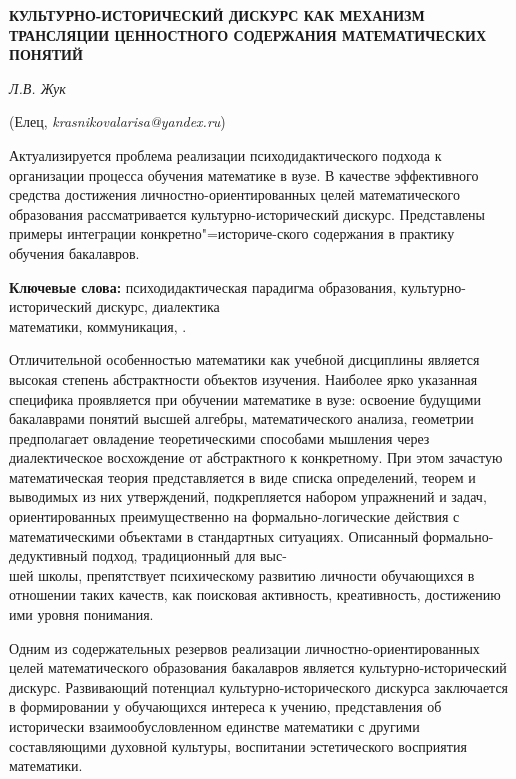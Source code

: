 \begin{center}
    {\bf  КУЛЬТУРНО-ИСТОРИЧЕСКИЙ ДИСКУРС КАК МЕХАНИЗМ ТРАНСЛЯЦИИ ЦЕННОСТНОГО СОДЕРЖАНИЯ МАТЕМАТИЧЕСКИХ ПОНЯТИЙ}

    {\it Л.В. Жук}

    (Елец, {\it krasnikovalarisa@yandex.ru})
\end{center}




Актуализируется проблема реализации психодидактического подхода к организации процесса обучения математике в вузе. В качестве эффективного средства достижения личностно-ориентированных целей математического образования рассматривается культурно-исторический дискурс. Представлены примеры интеграции конкретно"=историче-\linebreak ского содержания в практику обучения бакалавров.




{\bf Ключевые слова:} психодидактическая парадигма образования, культурно-исторический дискурс, диалектика \\математики, коммуника\-ция, .


Отличительной особенностью математики как учебной дисциплины является высокая степень абстрактности объектов изучения. Наиболее ярко указанная специфика проявляется при обучении математике в вузе: освоение будущими бакалаврами понятий высшей алгебры, математического анализа, геометрии предполагает овладение теоретическими способами мышления через диалектическое восхождение от абстрактного к конкретному. При этом зачастую математическая теория представляется в виде списка определений, теорем и выводимых из них утверждений, подкрепляется набором упражнений и задач, ориентированных преимущественно на формально-логические действия с математическими объектами в стандартных ситуациях. Описанный формально-дедуктивный подход, традиционный для выс-\\шей школы, препятствует психическому развитию личности обучающихся в отношении таких качеств, как поисковая активность, креативность, достижению ими уровня понимания.

Одним из содержательных резервов реализации лично\-стно-ориентированных целей математического образования бакалавров является культурно-исторический дискурс. Развивающий потенциал культурно-исторического дискурса заключается в формировании у обучающихся интереса к учению, представления об исторически взаимообусловленном единстве математики с другими составляющими духовной культуры, воспитании эстетического восприятия математики.

